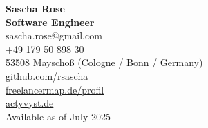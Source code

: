\documentclass[a4paper,10pt]{article}
\begin{document}
  \begin{adjustbox}{}
    \noindent
    \begin{minipage}[c]{0.72\textwidth}
      {\LARGE\color{sectionblue}\textbf{Sascha Rose}}\\[0.5em]
      {\color{sectionblue}\textbf{Software Engineer}}\\[1.5em]
      \textcolor{sectionblue}{\faEnvelope}\hspace{0.5em}sascha.rose@gmail.com\\[0.25em]
      \textcolor{sectionblue}{\faPhone}\hspace{0.5em}+49 179 50 898 30\\[0.25em]
      \textcolor{sectionblue}{\faHome}\hspace{0.5em}53508 Mayschoß (Cologne / Bonn / Germany)\\[1em]
      \textcolor{sectionblue}{\faGithubSquare}\hspace{0.5em}\href{https://github.com/rsascha}{github.com/rsascha}\\[0.25em]
      \textcolor{sectionblue}{\faInfoCircle}\hspace{0.5em}\href{https://www.freelancermap.de/profil/senior-fullstack-developer-react-react-native-nodejs-javascript-typescript}{freelancermap.de/profil}\\[0.25em]
      \textcolor{sectionblue}{\faInfoCircle}\hspace{0.5em}\href{https://agentur.actyvyst.de/}{actyvyst.de}\\[1em]
      \textcolor{sectiongreen}{\faSeedling}\hspace{0.5em}Available as of July 2025\\
    \end{minipage}
    \hfill
    \begin{minipage}[c]{0.3\textwidth}

\end{minipage}
\end{adjustbox}
\end{document}
